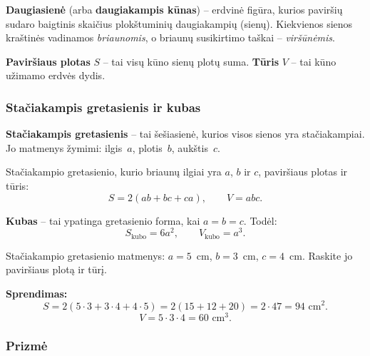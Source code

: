 \begin{definition}
\textbf{Daugiasienė} (arba \textbf{daugiakampis kūnas}) -- erdvinė figūra, kurios paviršių sudaro baigtinis skaičius plokštuminių daugiakampių (sienų). Kiekvienos sienos kraštinės vadinamos \emph{briaunomis}, o briaunų susikirtimo taškai -- \emph{viršūnėmis}.
\end{definition}

\begin{definition}
\textbf{Paviršiaus plotas} $S$ -- tai visų kūno sienų plotų suma. \textbf{Tūris} $V$ -- tai kūno užimamo erdvės dydis.
\end{definition}

\subsubsection*{Stačiakampis gretasienis ir kubas}

\begin{definition}
\textbf{Stačiakampis gretasienis} -- tai šešiasienė, kurios visos sienos yra stačiakampiai. Jo matmenys žymimi: ilgis~$a$, plotis~$b$, aukštis~$c$.
\end{definition}

\begin{theorem}
Stačiakampio gretasienio, kurio briaunų ilgiai yra $a$, $b$ ir $c$, paviršiaus plotas ir tūris:
\[
S = 2(ab + bc + ca), \qquad V = abc.
\]
\end{theorem}

\begin{remark}
\textbf{Kubas} -- tai ypatinga gretasienio forma, kai $a = b = c$. Todėl:
\[
S_{\text{kubo}} = 6a^2, \qquad V_{\text{kubo}} = a^3.
\]
\end{remark}

\begin{example}
Stačiakampio gretasienio matmenys: $a = 5$~cm, $b = 3$~cm, $c = 4$~cm. Raskite jo paviršiaus plotą ir tūrį.

\textbf{Sprendimas:}
\[
S = 2(5 \cdot 3 + 3 \cdot 4 + 4 \cdot 5) = 2(15 + 12 + 20) = 2 \cdot 47 = 94 \text{ cm}^2.
\]
\[
V = 5 \cdot 3 \cdot 4 = 60 \text{ cm}^3.
\]
\end{example}

\subsubsection*{Prizmė}

